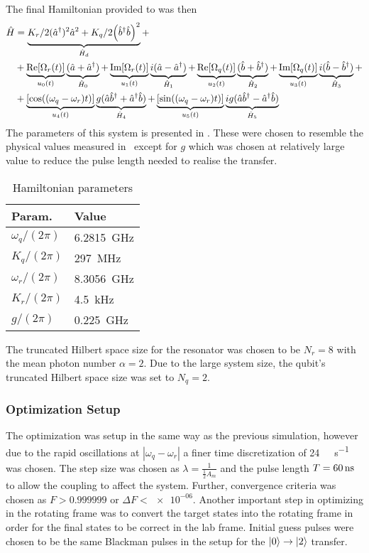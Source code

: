 \documentclass[main.tex]{subfiles}
\begin{document}
The final Hamiltonian provided to \krotov{} was then
\begin{equation}
    \begin{split}
        \hat{H} &= \underbrace{K_r/2(\hat{a}^\dagger)^2\hat{a}^2 +K_q/2\qty(\hat{b}^\dagger\hat{b})^2}_{\hat{H}_d} + \\
        &+\underbrace{\text{Re}\qty[\Omega_r(t)]}_{u_0(t)}\underbrace{(\hat{a} + \hat{a}^\dagger)}_{\hat{H}_0} + \underbrace{\text{Im}\qty[\Omega_r(t)]}_{u_1(t)}\underbrace{i(\hat{a} - \hat{a}^\dagger)}_{\hat{H}_1} + \underbrace{\text{Re}\qty[\Omega_q(t)]}_{u_2(t)}\underbrace{(\hat{b} + \hat{b}^\dagger)}_{\hat{H}_2} + \underbrace{\text{Im}\qty[\Omega_q(t)]}_{u_3(t)}\underbrace{i(\hat{b} - \hat{b}^\dagger)}_{\hat{H}_3} +\\
        &+\underbrace{\qty[\cos((\omega_q-\omega_r)t)]}_{u_4(t)}\underbrace{g(\hat{a}\hat{b}^\dagger + \hat{a}^\dagger\hat{b})}_{\hat{H}_4} + \underbrace{\qty[\sin((\omega_q-\omega_r)t)]}_{u_5(t)}\underbrace{ig(\hat{a}\hat{b}^\dagger - \hat{a}^\dagger\hat{b})}_{\hat{H}_5}
        \label{eq:cat-hamiltonian-rotating}
    \end{split}
\end{equation}
The parameters of this system is presented in .
These were chosen to resemble the physical values measured in~\cite{ofek_extending_2016} except for \(g\) which was chosen at relatively large value to reduce the pulse length needed to realise the transfer.
\begin{table}[H]
    \caption{Hamiltonian parameters}%
    \label{tab:ham-params}
    \centering
    \begin{tabular}{@{}ll@{}}
    \toprule
    Param. & Value\\ \midrule
    \(\omega_q/(2\pi)\) & \SI{6.2815}{\giga\hertz} \\
    \(K_q/(2\pi)\) & \SI{297}{\mega\hertz} \\
    \(\omega_r/(2\pi)\) & \SI{8.3056}{\giga\hertz} \\
    \(K_r/(2\pi)\) & \SI{4.5}{\kilo\hertz} \\
    \(g/(2\pi)\) & \SI{0.225}{\giga\hertz} \\
    \bottomrule
    \end{tabular}
\end{table}
The truncated Hilbert space size for the resonator was chosen to be \( N_r = 8 \) with the mean photon number \(\alpha = 2\).
Due to the large system size, the qubit's truncated Hilbert space size was set to \(N_q = 2\).

\subsubsection{Optimization Setup}
The optimization was setup in the same way as the previous simulation, however due to the rapid oscillations at \(|\omega_q-\omega_r|\) a finer time discretization of \SI{24}{\giga\samples\per\second} was chosen.
The step size was chosen as \(\lambda = \frac{1}{\frac{1}{2}A_{m}}\) and the pulse length \(T = \SI{60}{\nano\second}\) to allow the coupling to affect the system.
Further, convergence criteria was chosen as \(F>0.999999\) or \(\Delta F < \num{e-06}\).
Another important step in optimizing in the rotating frame was to convert the target states into the rotating frame in order for the final states to be correct in the lab frame.
Initial guess pulses were chosen to be the same Blackman pulses in the setup for the \(\ket{0}\rightarrow\ket{2}\) transfer.
\end{document}

